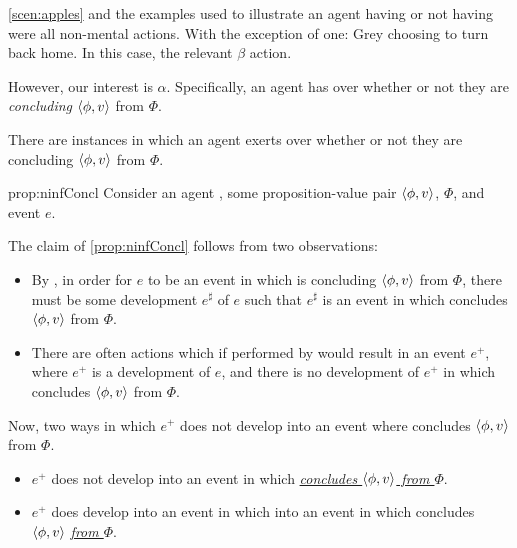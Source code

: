\begin{note}
  \nocite{Peacocke:2021aa}
  \autoref{scen:apples} and the examples used to illustrate an agent having or not having \ninf{} were all non-mental actions.
  With the exception of one:
  Grey choosing to turn back home.
  In this case, the relevant \(\beta\) action.

  However, our interest is \(\alpha\).
  Specifically, an agent has \ninf{} over whether or not they are \emph{concluding} \(\langle \phi, v \rangle\) from \(\Phi\).

  \begin{proposition}
    \label{prop:ninfConcl}
    There are instances in which an agent exerts  over whether or not they are concluding \(\langle \phi, v \rangle\) from \(\Phi\).
  \end{proposition}

  \begin{argument}{prop:ninfConcl}
    Consider an agent \vAgent{}, some proposition-value pair \(\langle \phi, v \rangle\), \poP{} \(\Phi\), and event \(e\).

    The claim of \autoref{prop:ninfConcl} follows from two observations:

    \begin{itemize}[noitemsep]
    \item
      By , in order for \(e\) to be an event in which \vAgent{} is concluding \(\langle \phi, v \rangle\) from \(\Phi\), there must be some  development \(e^{\sharp}\) of \(e\) such that \(e^{\sharp}\) is an event in which \vAgent{} concludes \(\langle \phi, v \rangle\) from \(\Phi\).
    \end{itemize}

    \begin{itemize}
    \item
      There are often actions which if performed by \vAgent{} would result in an event \(e^{+}\), where \(e^{+}\) is a development of \(e\), and there is no  development of \(e^{+}\) in which \vAgent{} concludes \(\langle \phi, v \rangle\) from \(\Phi\).
    \end{itemize}

    Now, two ways in which \(e^{+}\) does not develop into an event where \vAgent{} concludes \(\langle \phi, v \rangle\) from \(\Phi\).
    \begin{itemize}
    \item
      \(e^{+}\) does not develop into an event in which \vAgent{} \emph{\underline{concludes \(\langle \phi, v \rangle\) from \(\Phi\)}}.
    \item
      \(e^{+}\) does develop into an event in which  into an event in which \vAgent{} concludes \(\langle \phi, v \rangle\) \emph{\underline{from \(\Phi\)}}.
    \end{itemize}


\end{argument}
\end{note}
